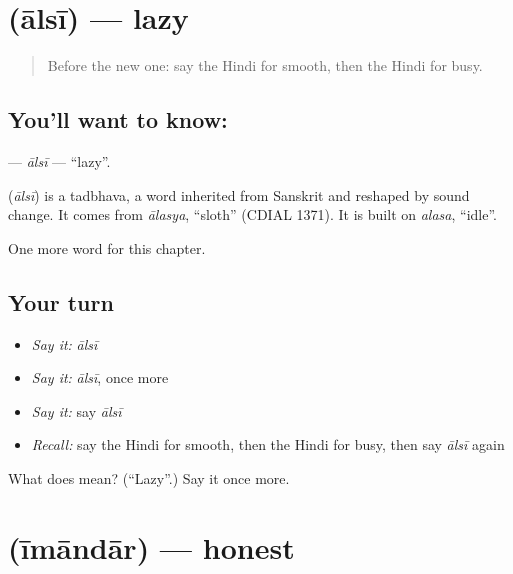\section[\texorpdfstring{\hi{आलसी} (ālsī)}{आलसी (ālsī)}]{ (ālsī) — lazy}

\label{lesson:HI-C214-alsi}



\begin{quote}
Before the new one: say the Hindi for smooth, then the Hindi for busy.
\end{quote}

\subsection*{You'll want to know: }
\textbf{} — \emph{ālsī} — \textquotedblleft{}lazy\textquotedblright{}.

\begin{cousinweb}
\textbf{} (\emph{ālsī}) is a tadbhava, a word inherited from Sanskrit and reshaped by sound change. It comes from \emph{ālasya}, \textquotedblleft{}sloth\textquotedblright{} (CDIAL 1371). It is built on \emph{alasa}, \textquotedblleft{}idle\textquotedblright{}.
\end{cousinweb}

\begin{grammarlens}[title={What you've built}]
One more word for this chapter.
\end{grammarlens}

\subsection*{Your turn}
\begin{itemize}
\raggedright
  \item \emph{Say it:} \emph{ālsī}
  \item \emph{Say it:} \emph{ālsī}, once more
  \item \emph{Say it:} say \emph{ālsī}
  \item \emph{Recall:} say the Hindi for smooth, then the Hindi for busy, then say \emph{ālsī} again
\end{itemize}

\begin{tcolorbox}[breakable,colback=teal!4,colframe=teal!35!black,title={Before you move on}]
What does  mean? (\textquotedblleft{}Lazy\textquotedblright{}.) Say it once more.
\end{tcolorbox}
\section[\texorpdfstring{\hi{ईमानदार} (īmāndār)}{ईमानदार (īmāndār)}]{ (īmāndār) — honest}


